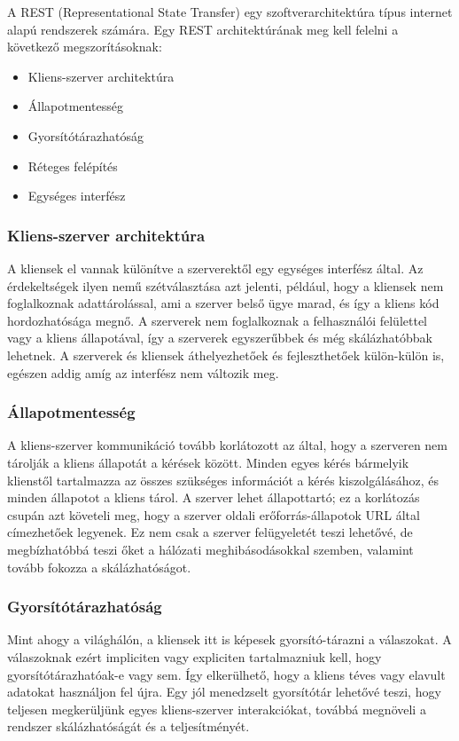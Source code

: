 A REST (Representational State Transfer) \cite{Wikipedia-REST} egy szoftverarchitektúra típus internet alapú rendszerek számára.
Egy REST architektúrának meg kell felelni a következő megszorításoknak:
\begin{itemize}
    \item Kliens-szerver architektúra
    \item Állapotmentesség
    \item Gyorsítótárazhatóság
    \item Réteges felépítés
    \item Egységes interfész
\end{itemize}

\subsubsection{Kliens-szerver architektúra}
A kliensek el vannak különítve a szerverektől egy egységes interfész által. Az érdekeltségek ilyen nemű szétválasztása azt jelenti, például, hogy a kliensek nem foglalkoznak adattárolással, ami a szerver belső ügye marad, és így a kliens kód hordozhatósága megnő. A szerverek nem foglalkoznak a felhasználói felülettel vagy a kliens állapotával, így a szerverek egyszerűbbek és még skálázhatóbbak lehetnek. A szerverek és kliensek áthelyezhetőek és fejleszthetőek külön-külön is, egészen addig amíg az interfész nem változik meg.
\subsubsection{Állapotmentesség}
A kliens-szerver kommunikáció tovább korlátozott az által, hogy a szerveren nem tárolják a kliens állapotát a kérések között. Minden egyes kérés bármelyik klienstől tartalmazza az összes szükséges információt a kérés kiszolgálásához, és minden állapotot a kliens tárol. A szerver lehet állapottartó; ez a korlátozás csupán azt követeli meg, hogy a szerver oldali erőforrás-állapotok URL által címezhetőek legyenek. Ez nem csak a szerver felügyeletét teszi lehetővé, de megbízhatóbbá teszi őket a hálózati meghibásodásokkal szemben, valamint tovább fokozza a skálázhatóságot.
\subsubsection{Gyorsítótárazhatóság}
Mint ahogy a világhálón, a kliensek itt is képesek gyorsító-tárazni a válaszokat. A válaszoknak ezért impliciten vagy expliciten tartalmazniuk kell, hogy gyorsítótárazhatóak-e vagy sem. Így elkerülhető, hogy a kliens téves vagy elavult adatokat használjon fel újra. Egy jól menedzselt gyorsítótár lehetővé teszi, hogy teljesen megkerüljünk egyes kliens-szerver interakciókat, továbbá megnöveli a rendszer skálázhatóságát és a teljesítményét.
